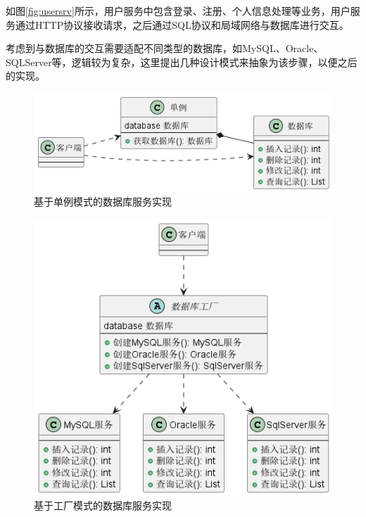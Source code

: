 如图\ref{fig:usersrv}所示，用户服务中包含登录、注册、个人信息处理等业务，用户服务通过HTTP协议接收请求，之后通过SQL协议和局域网络与数据库进行交互。

考虑到与数据库的交互需要适配不同类型的数据库，如MySQL、Oracle、SQLServer等，逻辑较为复杂，这里提出几种设计模式来抽象为该步骤，以便之后的实现。

\begin{figure}[H]
    \centering
    \includegraphics[scale=0.7]{examples/数据库服务-单例模式.png}
    \caption{基于单例模式的数据库服务实现}
    \label{fig:dbsrv_single}
\end{figure}

\begin{figure}[H]
    \centering
    \includegraphics[scale=0.5]{examples/数据库服务-工厂模式.png}
    \caption{基于工厂模式的数据库服务实现}
    \label{fig:dbsrv_factory}
\end{figure}

